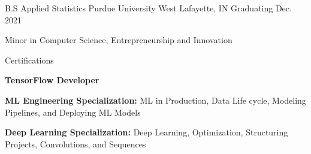 
\begin{cventries}
  \edcventry
    {B.S Applied Statistics} %
    {Purdue University} %
    {West Lafayette, IN} %
    {Graduating Dec. 2021} %
    {
      \begin{cvitems} %
         \item {Minor in Computer Science, Entrepreneurship and Innovation}
      \end{cvitems}
    }
    \cventry
    {} %
    {Certifications} %
    {} %
    {} %
    {
      \begin{cvitems} %
          \item {\textbf{TensorFlow Developer} {}}
         \item{\textbf{ML Engineering Specialization:} {ML in Production, Data Life cycle, Modeling Pipelines, and Deploying ML Models}}
         \item {\textbf{Deep Learning Specialization:} {Deep Learning, Optimization, Structuring Projects, Convolutions, and Sequences}}
      \end{cvitems}
    }
\end{cventries}
